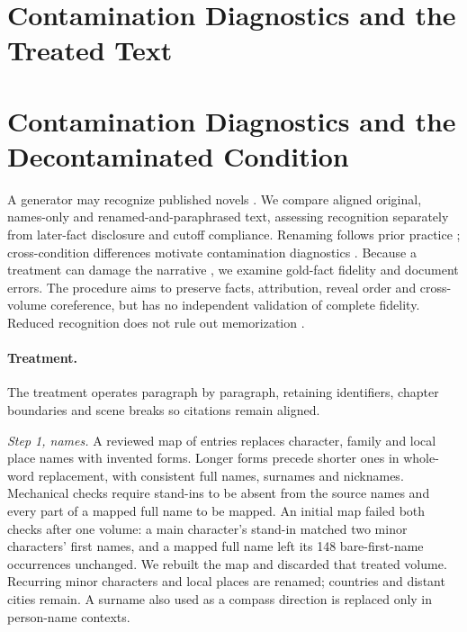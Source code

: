 \ifdefined\nwvtwo
\section{Contamination Diagnostics and the Treated Text}
\else
\section{Contamination Diagnostics and the Decontaminated Condition}
\fi
\label{app:contamination}

A generator may recognize published novels \citep{chang2023speak}. We compare aligned
original, names-only and renamed-and-paraphrased text, assessing recognition separately
from later-fact disclosure and cutoff compliance. Renaming follows prior practice
\citep{gupta2025whodunit, zhang2024infinitebench}; cross-condition differences motivate
contamination diagnostics \citep{dekoninck2024constat}. Because a treatment can damage
the narrative \citep{sun2025emperor}, we examine gold-fact fidelity and document errors.
The procedure aims to preserve facts, attribution, reveal order and cross-volume
coreference, but has no independent validation of complete fidelity. Reduced recognition
does not rule out memorization \citep{cheng2025contamination}.



\paragraph{Treatment.}
The treatment operates paragraph by paragraph, retaining identifiers, chapter boundaries
and scene breaks so citations remain aligned.

\emph{Step 1, names.} A reviewed map of  entries replaces character,
family and local place names with invented forms. Longer forms precede shorter ones
in whole-word replacement, with consistent full names, surnames and nicknames.
Mechanical checks require stand-ins to be absent from the source names and every part
of a mapped full name to be mapped. An initial map failed both checks after one volume:
a main character's stand-in matched two minor characters' first names, and a mapped
full name left its 148 bare-first-name occurrences unchanged. We rebuilt the map and
discarded that treated volume. Recurring minor characters and local places are renamed;
countries and distant cities remain. A surname also used as a compass direction is
replaced only in person-name contexts.

